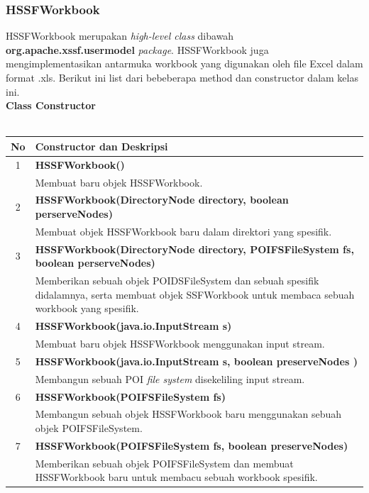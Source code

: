 \subsubsection{HSSFWorkbook} 
HSSFWorkbook merupakan \textit{high-level class} dibawah \textbf{org.apache.xssf.usermodel} \textit{package}. HSSFWorkbook juga mengimplementasikan antarmuka workbook yang digunakan oleh file Excel dalam format .xls. Berikut ini list dari bebeberapa method dan constructor dalam kelas ini.\cite{tutpoint}\\

\noindent \textbf{Class Constructor}\\ \\


	\begin{tabular}{|c|p{12cm}|}
		\hline
		\textbf{No} & \textbf{Constructor dan Deskripsi} \\ \hline \hline
		1 & \textbf{HSSFWorkbook()}\\
			&	Membuat baru objek HSSFWorkbook.\\ \hline 
		2 & \textbf{HSSFWorkbook(DirectoryNode directory, boolean perserveNodes)}\\
			&	Membuat objek HSSFWorkbook baru dalam direktori yang spesifik.\\ \hline
		3 & \textbf{HSSFWorkbook(DirectoryNode directory, POIFSFileSystem fs, boolean perserveNodes)}\\
			&	Memberikan sebuah objek POIDSFileSystem dan sebuah spesifik didalamnya, serta membuat objek SSFWorkbook untuk membaca sebuah workbook yang spesifik.\\ \hline 
		4 & \textbf{HSSFWorkbook(java.io.InputStream s)}\\
			&	Membuat baru objek HSSFWorkbook menggunakan input stream.\\ \hline
		5 & \textbf{HSSFWorkbook(java.io.InputStream s, boolean preserveNodes )}\\
			&	Membangun sebuah POI \textit{file system} disekeliling input stream.\\ \hline
		6 & \textbf{HSSFWorkbook(POIFSFileSystem fs)}\\
			&	Membangun sebuah objek HSSFWorkbook baru menggunakan sebuah objek POIFSFileSystem.\\ \hline 		
		7 & \textbf{HSSFWorkbook(POIFSFileSystem fs, boolean preserveNodes)}\\
			&	Memberikan sebuah objek POIFSFileSystem dan membuat HSSFWorkbook baru untuk membacu sebuah workbook spesifik.\\ \hline 
	\end{tabular}

